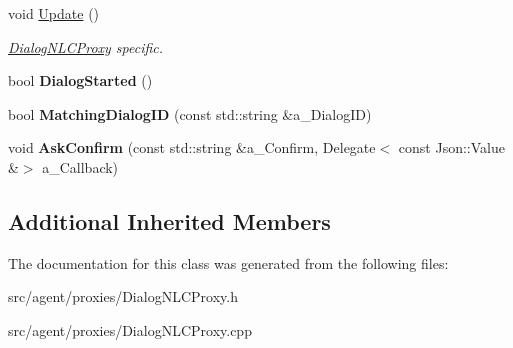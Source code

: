 \begin{DoxyCompactItemize}
void \hyperlink{class_dialog_n_l_c_proxy_a1ebe5b56a302b75e03d85355f6904084}{Update} ()
\begin{DoxyCompactList}\small\item\em \hyperlink{class_dialog_n_l_c_proxy}{Dialog\+N\+L\+C\+Proxy} specific. \end{DoxyCompactList}\item 
\mbox{\label{class_dialog_n_l_c_proxy_ad77e41ba6d867c4c1dce0129d84c827b}} 
bool {\bfseries Dialog\+Started} ()
\item 
\mbox{\label{class_dialog_n_l_c_proxy_aaaba7d67a342a17d7b751593f07f820e}} 
bool {\bfseries Matching\+Dialog\+ID} (const std\+::string \&a\+\_\+\+Dialog\+ID)
\item 
\mbox{\label{class_dialog_n_l_c_proxy_a3f5985550af486469d6eb2f6e7c9b7b9}} 
void {\bfseries Ask\+Confirm} (const std\+::string \&a\+\_\+\+Confirm, Delegate$<$ const Json\+::\+Value \&$>$ a\+\_\+\+Callback)
\end{DoxyCompactItemize}
\subsection*{Additional Inherited Members}


The documentation for this class was generated from the following files\+:\begin{DoxyCompactItemize}
\item 
src/agent/proxies/Dialog\+N\+L\+C\+Proxy.\+h\item 
src/agent/proxies/Dialog\+N\+L\+C\+Proxy.\+cpp\end{DoxyCompactItemize}
